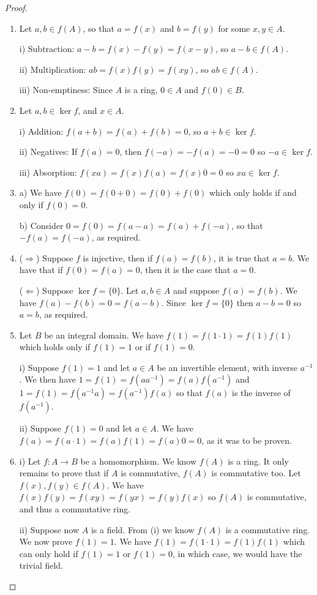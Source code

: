 \begin{proof}
 \begin{enumerate}
     \item Let $a,b\in f(A)$, so that $a=f(x)$ and $b=f(y)$ for some $x,y\in A$.

     i) Subtraction: $a-b=f(x)-f(y)=f(x-y)$, so $a-b\in f(A)$.

     ii) Multiplication: $ab= f(x)f(y)=f(xy)$, so $ab\in f(A)$.

     iii) Non-emptiness: Since $A$ is a ring, $0\in A$ and $f(0)\in B$.
     \item Let $a,b\in \ker f$, and $x\in A$.

     i) Addition: $f(a+b)=f(a)+f(b)=0$, so $a+b\in \ker f$.

     ii) Negatives: If $f(a)=0$, then $f(-a)=-f(a)=-0=0$ so $-a\in \ker f$.

     iii) Absorption: $f(xa)=f(x)f(a)=f(x)0=0$ so $xa\in \ker f$.
     \item a) We have $f(0)=f(0+0)=f(0)+f(0)$ which only holds if and only if $f(0)=0$.

     b) Consider $0=f(0)=f(a-a)=f(a)+f(-a)$, so that $-f(a)=f(-a)$, as required.
     \item ($\Rightarrow$) Suppose $f$ is injective, then if $f(a)=f(b)$, it is true that $a=b$. We have that if $f(0)=f(a)=0$, then it is the case that $a=0$.

     ($\Leftarrow$) Suppose $\ker f=\{0\}$. Let $a,b\in A$ and suppose $f(a)=f(b)$. We have $f(a)-f(b)=0=f(a-b)$. Since $\ker f=\{0\}$ then $a-b=0$ so $a=b$, as required.
     \item Let $B$ be an integral domain. We have $f(1)=f(1\cdot 1)=f(1)f(1)$ which holds only if $f(1)=1$ or if $f(1)=0$. 

     i) Suppose $f(1)=1$ and let $a\in A$ be an invertible element, with inverse $a^{-1}$. We then have $1=f(1)=f(aa^{-1})=f(a)f(a^{-1})$ and $1=f(1)=f(a^{-1}a)=f(a^{-1})f(a)$ so that $f(a)$ is the inverse of $f(a^{-1})$.

     ii) Suppose $f(1)=0$ and let $a\in A$. We have $f(a)=f(a\cdot 1)=f(a)f(1)=f(a)0=0$, as it was to be proven.
     \item i) Let $f:A\rightarrow B$ be a homomorphism. We know $f(A)$ is a ring. It only remains to prove that if $A$ is commutative, $f(A)$ is commutative too. Let $f(x),f(y)\in f(A)$. We have $f(x)f(y)=f(xy)=f(yx)=f(y)f(x)$ so $f(A)$ is commutative, and thus a commutative ring.

     ii) Suppose now $A$ is a field. From (i) we know $f(A)$ is a commutative ring. We now prove $f(1)=1$. We have $f(1)=f(1\cdot1)=f(1)f(1)$ which can only hold if $f(1)=1$ or $f(1)=0$, in which case, we would have the trivial field. 


\end{enumerate}
\end{proof}
